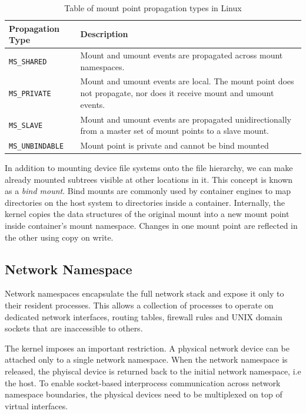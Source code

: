 \begin{table}[h!]
    \centering
    \begin{tabular}{ |m{4cm}|m{20em}| }
        \hline
        Propagation Type & Description \\
        \hline
        \verb|MS_SHARED| & Mount and umount events are propagated across mount namespaces. \\
        \hline 
        \verb|MS_PRIVATE| & Mount and umount events are local. The mount point does not propagate, nor does it receive mount and umount events. \\
        \hline
        \verb|MS_SLAVE| & Mount and umount events are propagated unidirectionally from a master set of mount points to a slave mount. \\
        \hline
        \verb|MS_UNBINDABLE| & Mount point is private and cannot be bind mounted \\
        \hline
    \end{tabular}
    \caption{Table of mount point propagation types in Linux}
    \label{table:fundamentals/namespaces/mount/propagation-types}
\end{table}

In addition to mounting device file systems onto the file hierarchy, we can make 
already mounted subtrees visible at other locations in it. This concept is known as a 
\textit{bind mount}. Bind mounts are commonly used by container engines to map directories 
on the host system to directories inside a container. Internally, the kernel copies
the data structures of the original mount into a new mount point inside 
container's mount namespace. Changes in one mount point are reflected in the other 
using copy on write. 

\subsection{Network Namespace}
\label{sections:fundamentals/namespaces/network}
Network namespaces encapsulate the full network stack and expose it only to 
their resident processes. This allows a collection of processes to operate on 
dedicated network interfaces, routing tables, firewall rules and UNIX domain sockets 
that are inaccessible to others. 

The kernel imposes an important restriction. A physical network device can be attached only 
to a single network namespace. When the network namespace is released, the phyiscal device 
is returned back to the initial network namespace, i.e the host. To enable socket-based interprocess
communication across network namespace boundaries, 
the physical devices need to be multiplexed on top of virtual interfaces. 

